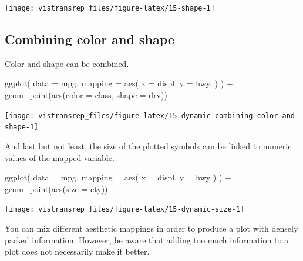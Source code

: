 \documentclass[]{book}
\newenvironment{Shaded}{}{}
\newcommand{\DataTypeTok}[1]{#1}
\newcommand{\KeywordTok}[1]{\textcolor[rgb]{0.00,0.00,1.00}{#1}}
\newcommand{\NormalTok}[1]{#1}
\newcommand{\OperatorTok}[1]{#1}
\newcommand{\StringTok}[1]{\textcolor[rgb]{0.00,0.50,0.50}{#1}}
\begin{document}
\begin{flushright}\texttt{[image: vistransrep\_files/figure-latex/15-shape-1]} \end{flushright}

\hypertarget{combining-color-and-shape}{%
\subsection{Combining color and shape}\label{combining-color-and-shape}}

Color and shape can be combined.

\begin{Shaded}
\begin{Highlighting}[]
\KeywordTok{ggplot}\NormalTok{(}
  \DataTypeTok{data =}\NormalTok{ mpg,}
  \DataTypeTok{mapping =} \KeywordTok{aes}\NormalTok{(}
    \DataTypeTok{x =}\NormalTok{ displ,}
    \DataTypeTok{y =}\NormalTok{ hwy,}
\NormalTok{  )}
\NormalTok{) }\OperatorTok{+}
\StringTok{  }\KeywordTok{geom_point}\NormalTok{(}\KeywordTok{aes}\NormalTok{(}\DataTypeTok{color =}\NormalTok{ class, }\DataTypeTok{shape =}\NormalTok{ drv))}
\end{Highlighting}
\end{Shaded}

\begin{flushright}\texttt{[image: vistransrep\_files/figure-latex/15-dynamic-combining-color-and-shape-1]} \end{flushright}

And last but not least, the size of the plotted symbols can be linked to numeric values of the mapped variable.

\begin{Shaded}
\begin{Highlighting}[]
\KeywordTok{ggplot}\NormalTok{(}
  \DataTypeTok{data =}\NormalTok{ mpg,}
  \DataTypeTok{mapping =} \KeywordTok{aes}\NormalTok{(}
    \DataTypeTok{x =}\NormalTok{ displ,}
    \DataTypeTok{y =}\NormalTok{ hwy}
\NormalTok{  )}
\NormalTok{) }\OperatorTok{+}
\StringTok{  }\KeywordTok{geom_point}\NormalTok{(}\KeywordTok{aes}\NormalTok{(}\DataTypeTok{size =}\NormalTok{ cty))}
\end{Highlighting}
\end{Shaded}

\begin{flushright}\texttt{[image: vistransrep\_files/figure-latex/15-dynamic-size-1]} \end{flushright}

You can mix different aesthetic mappings in order to produce a plot with densely packed information.
However, be aware that adding too much information to a plot does not necessarily make it better.
\end{document}
